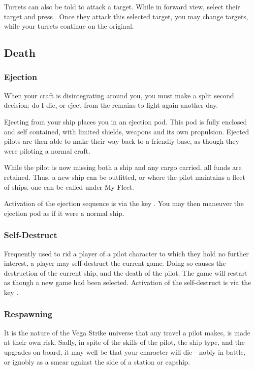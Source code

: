 \documentclass{article}
\newcommand{\key}[1]{%
  \tikz[baseline=(key.base)]{
    \node[draw=gray!50, fill=gray!5, rounded corners=2pt, inner sep=2pt, minimum height=1.5ex] (key) {\footnotesize\sffamily\bfseries #1};
  }%
}
\begin{document}
Turrets can also be told to attack a target. While in forward \key{F1} view, select their target and press \key{P}. Once they attack this selected target, you may change targets, while your turrets continue on the original. 

\subsection{ Death }

\subsubsection{ Ejection }

When your craft is disintegrating around you, you must make a split second decision: do I die, or eject from the remains to fight again another day. 


Ejecting from your ship places you in an ejection pod. This pod is fully enclosed and self contained, with limited shields, weapons and its own propulsion. Ejected pilots are then able to make their way back to a friendly base, as though they were piloting a normal craft. 


While the pilot is now missing both a ship and any cargo carried, all funds are retained. Thus, a new ship can be outfitted, or where the pilot maintains a fleet of ships, one can be called under My Fleet. 


Activation of the ejection sequence is via the key \key{E}. You may then maneuver the ejection pod as if it were a normal ship. 



\subsubsection{ Self-Destruct }

Frequently used to rid a player of a pilot character to which they hold no further interest, a player may self-destruct the current game. Doing so causes the destruction of the current ship, and the death of the pilot. The game will restart as though a new game had been selected. Activation of the self-destruct is via the key \key{!}. 

\subsubsection{ Respawning }

It is the nature of the Vega Strike universe that any travel a pilot makes, is made at their own risk. Sadly, in spite of the skills of the pilot, the ship type, and the upgrades on board, it may well be that your character will die - nobly in battle, or ignobly as a smear against the side of a station or capship. 
\end{document}
